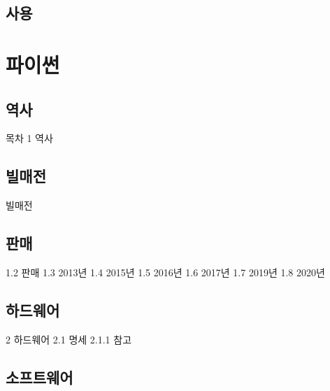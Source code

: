 \documentclass[12pt, a4paper, oneside]{book}
\let\stdsection\section
\renewcommand\section{\newpage\stdsection}
\begin{document}
	\section{ 사용}




	\chapter{파이썬}
	\noptcrule

	\newpage	
	\minitoc








%
	\section{ 역사}



목차
1	역사
	\section{ 빌매전}


빌매전

	\section{ 판매}

1.2	판매
1.3	2013년
1.4	2015년
1.5	2016년
1.6	2017년
1.7	2019년
1.8	2020년

	\section{ 하드웨어}

2	하드웨어
2.1	명세
2.1.1	참고


	\section{ 소프트웨어}
\end{document}
